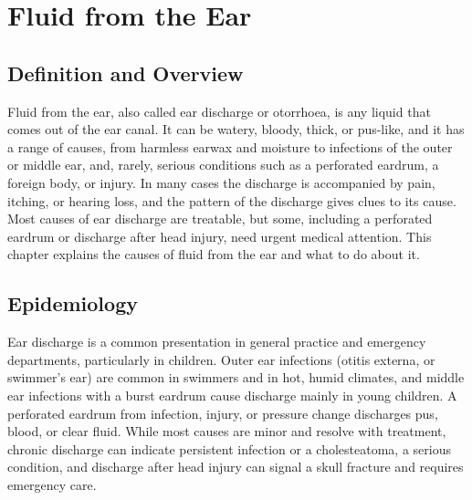 \chapter{Fluid from the Ear}

\section*{Definition and Overview}
Fluid from the ear, also called ear discharge or otorrhoea, is any liquid that comes out of the ear canal. It can be watery, bloody, thick, or pus-like, and it has a range of causes, from harmless earwax and moisture to infections of the outer or middle ear, and, rarely, serious conditions such as a perforated eardrum, a foreign body, or injury. In many cases the discharge is accompanied by pain, itching, or hearing loss, and the pattern of the discharge gives clues to its cause. Most causes of ear discharge are treatable, but some, including a perforated eardrum or discharge after head injury, need urgent medical attention. This chapter explains the causes of fluid from the ear and what to do about it.

\section*{Epidemiology}
Ear discharge is a common presentation in general practice and emergency departments, particularly in children. Outer ear infections (otitis externa, or swimmer's ear) are common in swimmers and in hot, humid climates, and middle ear infections with a burst eardrum cause discharge mainly in young children. A perforated eardrum from infection, injury, or pressure change discharges pus, blood, or clear fluid. While most causes are minor and resolve with treatment, chronic discharge can indicate persistent infection or a cholesteatoma, a serious condition, and discharge after head injury can signal a skull fracture and requires emergency care.

